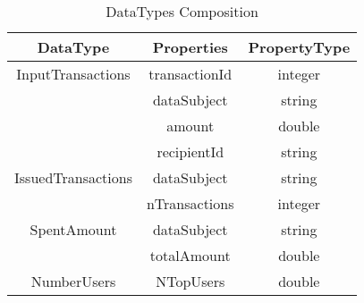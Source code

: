 \begin{table}[h!]
\centering
	\begin{tabular}{||c|c|c||} 
	\hline\hline
	DataType & Properties & PropertyType \\ [1ex] 
	\hline\hline
	InputTransactions & transactionId & integer  \\
	& dataSubject & string  \\
	& amount & double  \\
	& recipientId & string  \\
	\hline
	IssuedTransactions & dataSubject & string  \\
	& nTransactions & integer \\
	\hline
	SpentAmount & dataSubject & string  \\
	& totalAmount & double \\
	\hline
	NumberUsers & NTopUsers & double  \\
	\hline\hline
	\end{tabular}
\caption{DataTypes Composition}
\label{DataTypes Composition}
\end{table}
